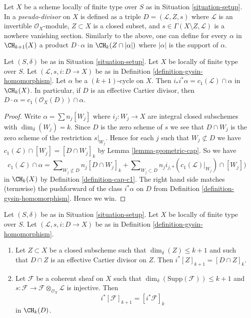 \begin{remark}
\label{remark-generalize-to-pseudo-divisor}
Let $X$ be a scheme locally of finite type over $S$ as in
Situation \ref{situation-setup}. In \cite{F} a {\it pseudo-divisor} on $X$
is defined as a triple $D = (\mathcal{L}, Z, s)$ where $\mathcal{L}$
is an invertible $\mathcal{O}_X$-module, $Z \subset X$ is a closed subset,
and $s \in \Gamma(X \setminus Z, \mathcal{L})$ is a nowhere vanishing
section. Similarly to the above, one can define for every $\alpha$
in $\CH_{k + 1}(X)$ a product $D \cdot \alpha$ in $\CH_k(Z \cap |\alpha|)$
where $|\alpha|$ is the support of $\alpha$.
\end{remark}

\begin{lemma}
\label{lemma-support-cap-effective-Cartier}
Let $(S, \delta)$ be as in Situation \ref{situation-setup}. Let $X$ be locally
of finite type over $S$. Let $(\mathcal{L}, s, i : D \to X)$ be as in
Definition \ref{definition-gysin-homomorphism}. Let $\alpha$ be a
$(k + 1)$-cycle on $X$. Then $i_*i^*\alpha = c_1(\mathcal{L}) \cap \alpha$
in $\CH_k(X)$. In particular, if $D$ is an effective Cartier divisor, then
$D \cdot \alpha = c_1(\mathcal{O}_X(D)) \cap \alpha$.
\end{lemma}

\begin{proof}
Write $\alpha = \sum n_j[W_j]$ where $i_j : W_j \to X$ are integral closed
subschemes with $\dim_\delta(W_j) = k$.
Since $D$ is the zero scheme of $s$ we see that $D \cap W_j$ is the zero scheme
of the restriction $s|_{W_j}$. Hence for each $j$ such that
$W_j \not \subset D$ we have
$c_1(\mathcal{L}) \cap [W_j] = [D \cap W_j]_k$
by Lemma \ref{lemma-geometric-cap}. So we have
$$
c_1(\mathcal{L}) \cap \alpha
=
\sum\nolimits_{W_j \not \subset D} n_j[D \cap W_j]_k
+
\sum\nolimits_{W_j \subset D}
n_j i_{j, *}(c_1(\mathcal{L})|_{W_j}) \cap [W_j])
$$
in $\CH_k(X)$ by Definition \ref{definition-cap-c1}.
The right hand side matches (termwise) the pushforward of the class
$i^*\alpha$ on $D$ from Definition \ref{definition-gysin-homomorphism}.
Hence we win.
\end{proof}

\begin{lemma}
\label{lemma-easy-gysin}
Let $(S, \delta)$ be as in Situation \ref{situation-setup}.
Let $X$ be locally of finite type over $S$.
Let $(\mathcal{L}, s, i : D \to X)$ be as in
Definition \ref{definition-gysin-homomorphism}.
\begin{enumerate}
\item Let $Z \subset X$ be a closed subscheme such
that $\dim_\delta(Z) \leq k + 1$ and such that
$D \cap Z$ is an effective Cartier divisor on $Z$. Then
$i^*[Z]_{k + 1} = [D \cap Z]_k$.
\item Let $\mathcal{F}$ be a coherent sheaf on $X$
such that $\dim_\delta(\text{Supp}(\mathcal{F})) \leq k + 1$ and
$s : \mathcal{F} \to \mathcal{F} \otimes_{\mathcal{O}_X} \mathcal{L}$
is injective. Then
$$
i^*[\mathcal{F}]_{k + 1} = [i^*\mathcal{F}]_k
$$
in $\CH_k(D)$.
\end{enumerate}
\end{lemma}

